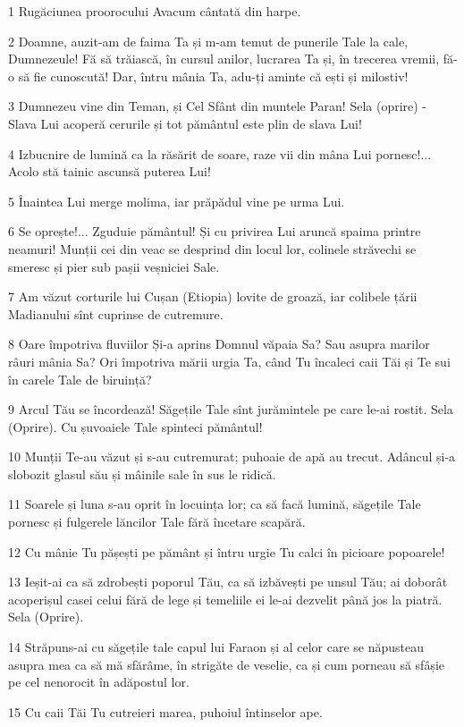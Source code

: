 \par 1 Rugăciunea proorocului Avacum cântată din harpe.
\par 2 Doamne, auzit-am de faima Ta și m-am temut de punerile Tale la cale, Dumnezeule! Fă să trăiască, în cursul anilor, lucrarea Ta și, în trecerea vremii, fă-o să fie cunoscută! Dar, întru mânia Ta, adu-ți aminte că ești și milostiv!
\par 3 Dumnezeu vine din Teman, și Cel Sfânt din muntele Paran! Sela (oprire) - Slava Lui acoperă cerurile și tot pământul este plin de slava Lui!
\par 4 Izbucnire de lumină ca la răsărit de soare, raze vii din mâna Lui pornesc!... Acolo stă tainic ascunsă puterea Lui!
\par 5 Înaintea Lui merge molima, iar prăpădul vine pe urma Lui.
\par 6 Se oprește!... Zguduie pământul! Și cu privirea Lui aruncă spaima printre neamuri! Munții cei din veac se desprind din locul lor, colinele străvechi se smeresc și pier sub pașii veșniciei Sale.
\par 7 Am văzut corturile lui Cușan (Etiopia) lovite de groază, iar colibele țării Madianului sînt cuprinse de cutremure.
\par 8 Oare împotriva fluviilor Și-a aprins Domnul văpaia Sa? Sau asupra marilor râuri mânia Sa? Ori împotriva mării urgia Ta, când Tu încaleci caii Tăi și Te sui în carele Tale de biruință?
\par 9 Arcul Tău se încordează! Săgețile Tale sînt jurămintele pe care le-ai rostit. Sela (Oprire). Cu șuvoaiele Tale spinteci pământul!
\par 10 Munții Te-au văzut și s-au cutremurat; puhoaie de apă au trecut. Adâncul și-a slobozit glasul său și mâinile sale în sus le ridică.
\par 11 Soarele și luna s-au oprit în locuința lor; ca să facă lumină, săgețile Tale pornesc și fulgerele lăncilor Tale fără încetare scapără.
\par 12 Cu mânie Tu pășești pe pământ și întru urgie Tu calci în picioare popoarele!
\par 13 Ieșit-ai ca să zdrobești poporul Tău, ca să izbăvești pe unsul Tău; ai doborât acoperișul casei celui fără de lege și temeliile ei le-ai dezvelit până jos la piatră. Sela (Oprire).
\par 14 Străpuns-ai cu săgețile tale capul lui Faraon și al celor care se năpusteau asupra mea ca să mă sfărâme, în strigăte de veselie, ca și cum porneau să sfâșie pe cel nenorocit în adăpostul lor.
\par 15 Cu caii Tăi Tu cutreieri marea, puhoiul întinselor ape.
